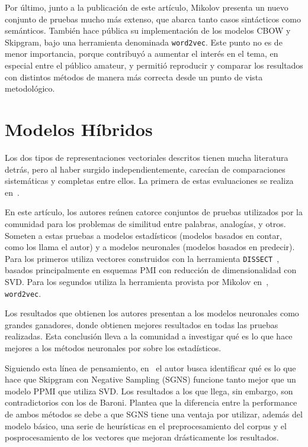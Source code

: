 Por último, junto a la publicación de este artículo, Mikolov presenta un nuevo conjunto de pruebas
mucho más extenso, que abarca tanto casos sintácticos como semánticos. También hace pública su
implementación de los modelos CBOW y Skipgram, bajo una herramienta denominada
\texttt{word2vec}. Este punto no es de menor importancia, porque contribuyó a aumentar el interés en
el tema, en especial entre el público amateur, y permitió reproducir y comparar los resultados con
distintos métodos de manera más correcta desde un punto de vista metodológico.


\section{Modelos Híbridos}

Los dos tipos de representaciones vectoriales descritos tienen mucha literatura detrás, pero al
haber surgido independientemente, carecían de comparaciones sistemáticas y completas entre ellos. La
primera de estas evaluaciones se realiza en~\cite{Baroni2014}.

En este artículo, los autores reúnen catorce conjuntos de pruebas utilizados por la comunidad para
los problemas de similitud entre palabras, analogías, y otros. Someten a estas pruebas a modelos
estadísticos (modelos basados en contar, como los llama el autor) y a modelos neuronales (modelos
basados en predecir). Para los primeros utiliza vectores construidos con la herramienta
\texttt{DISSECT}~\cite{Dinu2013}, basados principalmente en esquemas PMI con reducción de
dimensionalidad con SVD\@. Para los segundos utiliza la herramienta provista por Mikolov
en~\cite{Mikolov2013c}, \texttt{word2vec}.

Los resultados que obtienen los autores presentan a los modelos neuronales como grandes ganadores,
donde obtienen mejores resultados en todas las pruebas realizadas. Esta conclusión lleva a la
comunidad a investigar qué es lo que hace mejores a los métodos neuronales por sobre los
estadísticos.

Siguiendo esta línea de pensamiento, en~\cite{Levy2015} el autor busca identificar qué es lo que
hace que Skipgram con Negative Sampling (SGNS) funcione tanto mejor que un modelo PPMI que utiliza
SVD\@. Los resultados a los que llega, sin embargo, son contradictorios con los de Baroni. Plantea
que la diferencia entre la performance de ambos métodos se debe a que SGNS tiene una ventaja por
utilizar, además del modelo básico, una serie de heurísticas en el preprocesamiento del corpus y el
posprocesamiento de los vectores que mejoran drásticamente los resultados.

